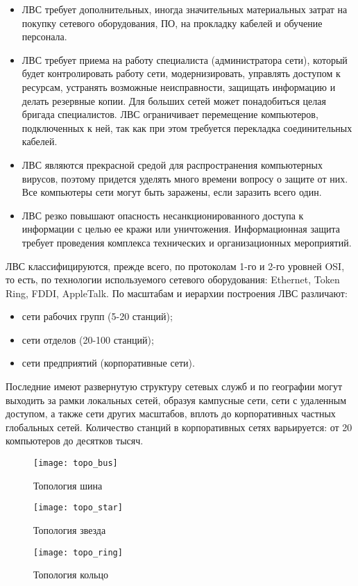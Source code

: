 \begin{itemize}
    \item ЛВС требует дополнительных, иногда значительных материальных затрат на
        покупку сетевого оборудования, ПО, на прокладку кабелей и обучение персонала. 
    \item ЛВС требует приема на работу специалиста (администратора сети),  который
        будет контролировать  работу сети, модернизировать, управлять доступом к
        ресурсам, устранять возможные неисправности, защищать информацию и делать
        резервные копии. Для больших сетей может понадобиться целая бригада
        специалистов. ЛВС ограничивает перемещение компьютеров, подключенных к ней, так
        как при этом требуется перекладка соединительных кабелей.
    \item ЛВС являются прекрасной средой для распространения компьютерных  вирусов,
        поэтому придется уделять  много  времени  вопросу о защите от них. Все
        компьютеры сети могут быть заражены, если заразить всего один.
    \item ЛВС резко повышают опасность несанкционированного доступа к информации с целью
        ее кражи или уничтожения. Информационная защита требует проведения комплекса
        технических и организационных мероприятий.
\end{itemize}

ЛВС классифицируются,  прежде  всего, по протоколам  1-го  и  2-го уровней OSI, то есть,
по технологии используемого сетевого оборудования: Ethernet, Token Ring, FDDI,
AppleTalk. По масштабам и иерархии построения ЛВС различают: 
\begin{itemize}
    \item сети рабочих групп (5-20 станций); 
    \item сети отделов (20-100 станций); 
    \item сети предприятий (корпоративные сети).
\end{itemize}

Последние имеют  развернутую структуру  сетевых  служб  и  по  географии могут выходить
за рамки локальных сетей, образуя кампусные сети, сети с удаленным доступом, а также
сети других масштабов, вплоть до корпоративных частных глобальных сетей. Количество
станций в корпоративных сетях варьируется: от 20 компьютеров до десятков тысяч.

\begin{figure}[h]
    \center
    \texttt{[image: topo\_bus]}
    \caption{Топология {шина}}
    \label{pic:topo_bus}
\end{figure}
\begin{figure}[h]
    \center
    \texttt{[image: topo\_star]}
    \caption{Топология {звезда}}
    \label{pic:topo_star}
\end{figure}
\begin{figure}[h]
    \center
    \texttt{[image: topo\_ring]}
    \caption{Топология {кольцо}}
    \label{pic:topo_ring}
\end{figure}

